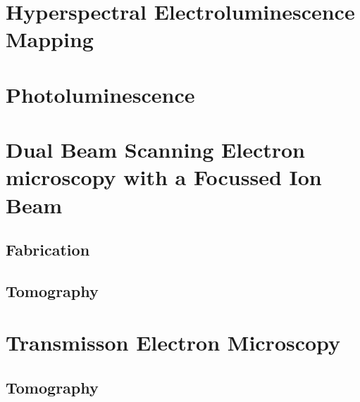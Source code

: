 \section{Hyperspectral Electroluminescence Mapping}
\section{Photoluminescence}
\section{Dual Beam Scanning Electron microscopy with a Focussed Ion Beam}
\subsection{Fabrication}
\subsection{Tomography}
\section{Transmisson Electron Microscopy}
\subsection{Tomography}


